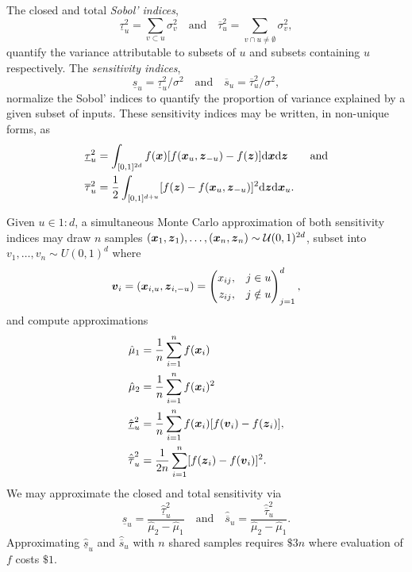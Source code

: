 \documentclass{article}
\begin{document}
The closed and total \emph{Sobol' indices},
\begin{equation}
    \label{eq:sobol_indices}
    \underline{\tau}_u^2 = \sum_{v \subset u} \sigma^2_v \quad \text{and} \quad 
    \overline{\tau}_u^2 = \sum_{v \cap u \neq \emptyset} \sigma^2_v,
\end{equation}
quantify the variance attributable to subsets of $u$ and subsets containing $u$ respectively. The \emph{sensitivity indices},
\begin{equation}
    \label{eq:sensitivity_indices}
    \underline{s}_u = \underline{\tau}_u^2/\sigma^2 \quad \text{and} \quad 
    \overline{s}_u = \overline{\tau}_u^2/\sigma^2,
\end{equation}
normalize the Sobol' indices to quantify the proportion of variance explained by a given subset of inputs. These sensitivity indices may be written, in non-unique forms, as
\begin{align}
    \underline{\tau}_u^2 &= \int_{[0,1]^{2d}} f(\boldsymbol{x})[f(\boldsymbol{x}_u,\boldsymbol{z}_{-u})-f(\boldsymbol{z})]\mathrm{d}\boldsymbol{x}\mathrm{d}\boldsymbol{z} \qquad \text{and} \\
    \overline{\tau}_u^2 &= \frac{1}{2}\int_{[0,1]^{d+u}} [f(\boldsymbol{z})-f(\boldsymbol{x}_u,\boldsymbol{z}_{-u})]^2\mathrm{d}\boldsymbol{z}\mathrm{d}\boldsymbol{x}_u.
\end{align}

Given $u \in 1:d$, a simultaneous Monte Carlo approximation of both sensitivity indices may draw $n$ samples $(\boldsymbol{x}_1,\boldsymbol{z}_1), \dots, (\boldsymbol{x}_n,\boldsymbol{z}_n) \sim \mathcal{U}(0,1)^{2d}$, subset into $v_1,\dots,v_n \sim U(0,1)^d$ where
\begin{equation}
    \boldsymbol{v}_i = (\boldsymbol{x}_{i,u},\boldsymbol{z}_{i,-u}) = \left(\begin{aligned}x_{ij}, \quad & j \in u \\ z_{ij}, \quad & j \notin u \end{aligned}\right)_{j=1}^d,
\end{equation}
and compute approximations
\begin{subequations}
\label{eq:int_approxs}
\begin{align}
    \hat{\mu}_1 &= \frac{1}{n} \sum_{i=1}^n f(\bx_i) \\ %
    \hat{\mu}_2 &= \frac{1}{n} \sum_{i=1}^n f(\bx_i)^2 \\ %
    \hat{\underline{\tau}}_u^2 &= \frac{1}{n} \sum_{i=1}^n f(\bx_i)[f(\bv_i) - f(\bz_i)], \\ %
    \hat{\overline{\tau}}_u^2 &= \frac{1}{2n} \sum_{i=1}^n [f(\bz_i)-f(\bv_i)]^2. %
\end{align}
\end{subequations}
We may approximate the closed and total sensitivity via
\begin{equation}
    \hat{\underline{s}}_u = \frac{\hat{\underline{\tau}}_u^2}{\hat{\mu}_2-\hat{\mu}_1} \quad \text{and} \quad 
    \hat{\overline{s}}_u = \frac{\hat{\overline{\tau}}_u^2}{\hat{\mu}_2-\hat{\mu}_1}.
\end{equation}
Approximating $\hat{\underline{s}}_u$ and $\hat{\overline{s}}_u$ with $n$ shared samples requires $\$3n$ where evaluation of $f$ costs $\$1$. 
\end{document}
